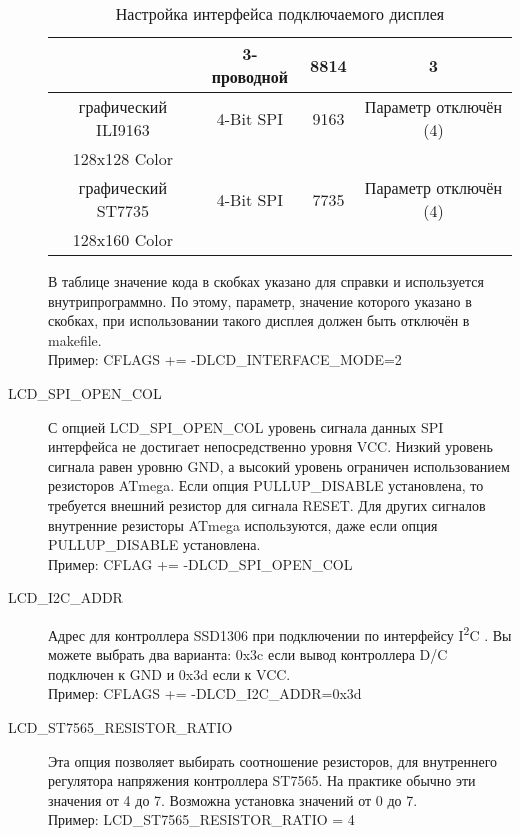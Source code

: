 \begin{description}
\begin{table}[H]
\begin{center}
\begin{tabular}{| c | c | c | c|}
                      & 3-проводной      &   8814          &   3 \\
    \hline
  графический ILI9163 & 4-Bit SPI        &   9163          &  Параметр отключён (4) \\
  128x128 Color     &                 &                   &              \\
    \hline
  графический ST7735 & 4-Bit SPI         &   7735          &  Параметр отключён (4) \\
  128x160 Color     &                 &                   &              \\
    \hline
    \end{tabular}
  \end{center}
  \caption{Настройка интерфейса подключаемого дисплея}
  \label{tab:cod-display}
\end{table}

В таблице значение кода в скобках указано для справки и используется внутрипрограммно.
По этому, параметр, значение которого указано в скобках, при использовании такого дисплея 
должен быть отключён в makefile.\\
Пример: CFLAGS += -DLCD\_INTERFACE\_MODE=2

 \item[LCD\_SPI\_OPEN\_COL] С опцией LCD\_SPI\_OPEN\_COL уровень сигнала данных SPI интерфейса
не достигает непосредственно уровня VCC.
Низкий уровень сигнала равен уровню GND, а высокий уровень ограничен использованием  резисторов ATmega.
Если опция PULLUP\_DISABLE установлена, то требуется внешний резистор для сигнала RESET.
Для других сигналов внутренние  резисторы ATmega используются, 
даже если опция PULLUP\_DISABLE установлена.\\
Пример: CFLAG += -DLCD\_SPI\_OPEN\_COL

  \item[LCD\_I2C\_ADDR] Адрес для контроллера SSD1306 при подключении по интерфейсу I\textsuperscript{2}C . Вы можете выбрать два 
варианта: 0x3c если вывод контроллера D/C подключен к GND и 0x3d если к VCC.\\ 
Пример: CFLAGS += -DLCD\_I2C\_ADDR=0x3d

  \item[LCD\_ST7565\_RESISTOR\_RATIO] Эта опция позволяет выбирать соотношение резисторов, для внутреннего 
регулятора напряжения контроллера ST7565.
На практике обычно эти значения от 4 до 7.
Возможна установка значений от 0 до 7.\\
Пример: LCD\_ST7565\_RESISTOR\_RATIO = 4


\end{description}
